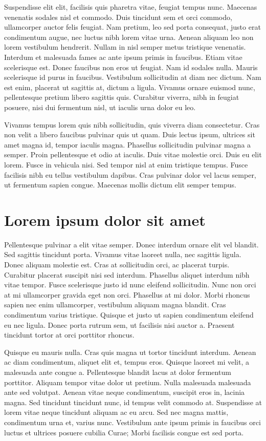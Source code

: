 Suspendisse elit elit, facilisis quis pharetra vitae, feugiat tempus nunc. Maecenas venenatis sodales nisl et commodo. Duis tincidunt sem et orci commodo, ullamcorper auctor felis feugiat. Nam pretium, leo sed porta consequat, justo erat condimentum augue, nec luctus nibh lorem vitae urna. Aenean aliquam leo non lorem vestibulum hendrerit. Nullam in nisl semper metus tristique venenatis. Interdum et malesuada fames ac ante ipsum primis in faucibus. Etiam vitae scelerisque est. Donec faucibus non eros ut feugiat. Nam id sodales nulla. Mauris scelerisque id purus in faucibus. Vestibulum sollicitudin at diam nec dictum. Nam est enim, placerat ut sagittis at, dictum a ligula. Vivamus ornare euismod nunc, pellentesque pretium libero sagittis quis. Curabitur viverra, nibh in feugiat posuere, nisi dui fermentum nisl, ut iaculis urna dolor eu leo.

Vivamus tempus lorem quis nibh sollicitudin, quis viverra diam consectetur. Cras non velit a libero faucibus pulvinar quis ut quam. Duis lectus ipsum, ultrices sit amet magna id, tempor iaculis magna. Phasellus sollicitudin pulvinar magna a semper. Proin pellentesque et odio at iaculis. Duis vitae molestie orci. Duis eu elit lorem. Fusce in vehicula nisi. Sed tempor nisl at enim tristique tempus. Fusce facilisis nibh eu tellus vestibulum dapibus. Cras pulvinar dolor vel lacus semper, ut fermentum sapien congue. Maecenas mollis dictum elit semper tempus.

\section{Lorem ipsum dolor sit amet}\label{sec:LABEL_CHP_1_SEC_G}
Pellentesque pulvinar a elit vitae semper. Donec interdum ornare elit vel blandit. Sed sagittis tincidunt porta. Vivamus vitae laoreet nulla, nec sagittis ligula. Donec aliquam molestie est. Cras at sollicitudin orci, ac placerat turpis. Curabitur placerat suscipit nisi sed interdum. Phasellus aliquet interdum nibh vitae tempor. Fusce scelerisque justo id nunc eleifend sollicitudin. Nunc non orci at mi ullamcorper gravida eget non orci. Phasellus at mi dolor. Morbi rhoncus sapien nec enim ullamcorper, vestibulum aliquam magna blandit. Cras condimentum varius tristique. Quisque et justo ut sapien condimentum eleifend eu nec ligula. Donec porta rutrum sem, ut facilisis nisi auctor a. Praesent tincidunt tortor at orci porttitor rhoncus.

Quisque eu mauris nulla. Cras quis magna ut tortor tincidunt interdum. Aenean ac diam condimentum, aliquet elit et, tempus eros. Quisque laoreet mi velit, a malesuada ante congue a. Pellentesque blandit lacus at dolor fermentum porttitor. Aliquam tempor vitae dolor ut pretium. Nulla malesuada malesuada ante sed volutpat. Aenean vitae neque condimentum, suscipit eros in, lacinia magna. Sed tincidunt tincidunt nunc, id tempus velit commodo at. Suspendisse at lorem vitae neque tincidunt aliquam ac eu arcu. Sed nec magna mattis, condimentum urna et, varius nunc. Vestibulum ante ipsum primis in faucibus orci luctus et ultrices posuere cubilia Curae; Morbi facilisis congue est sed porta.
